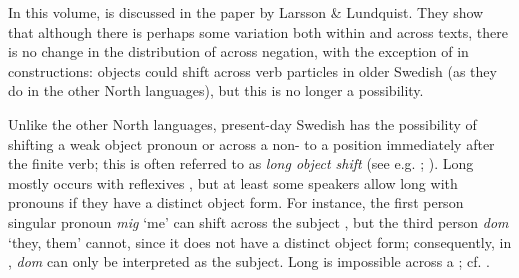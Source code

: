 \documentclass[output=paper]{langscibook}
\begin{document}
In this volume,  is discussed in the paper by Larsson \& Lundquist. They show that although there is perhaps some variation both within and across texts, there is no change in the distribution of  across negation, with the exception of  in  constructions: objects could shift across verb particles in older Swedish (as they do in the other North  languages), but this is no longer a possibility.  



Unlike the other North  languages, present-day Swedish has the possibility of shifting a weak object pronoun or  across a non- to a position immediately after the finite verb; this is often referred to as \textit{long object shift} (see e.g. \citealt{Holmberg1986}; \citealt{Heinat2010}). Long  mostly occurs with reflexives , but at least some speakers allow long  with pronouns if they have a distinct object form. For instance, the first person singular pronoun \textit{mig} ‘me’ can shift across the subject , but the third person \textit{dom} ‘they, them’ cannot, since it does not have a distinct object form; consequently, in , \textit{dom} can only be interpreted as the subject. Long  is impossible across a ; cf. .


\ea \label{ex:intro:20}



\end{document}
